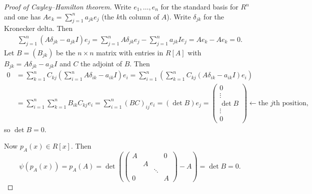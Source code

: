 \documentclass[a4paper]{article}
\theoremstyle{definition}
\begin{document}
\begin{proof}[Proof of Cayley–Hamilton theorem]
Write $e_1,\ldots,e_n$ for the standard basis for $R^n$ and one has $Ae_k=\sum_{j=1}^n a_{jk} e_j$ (the $k$th column of $A$). Write $\delta_{jk}$ for the Kronecker delta. Then
\[
\begin{aligned}
\sum_{j=1}^n \left(A\delta_{jk}-a_{jk}I\right) e_j=\sum_{j=1}^n A\delta_{jk}e_j - \sum_{j=1}^n a_{jk}Ie_j = Ae_k-Ae_k=0.
\end{aligned}
\]
Let $B=(B_{jk})$ be the $n\times n$ matrix with entries in $R[A]$ with $B_{jk}=A\delta_{jk}-a_{jk}I$ and $C$ the adjoint of $B$. Then
\[
\begin{aligned}
0&=\sum_{k=1}^n C_{kj} \left(\sum_{i=1}^n A\delta_{ik}-a_{ik} I\right)e_i = \sum_{i=1}^n \left( \sum_{k=1}^n C_{kj} (A\delta_{ik}-a_{ik}I)e_i \right) \\
&=\sum_{i=1}^n \sum_{k=1}^n B_{ik}C_{kj} e_i=\sum_{i=1}^n (BC)_{ij} e_i=(\det B )e_j=\begin{pmatrix}
0 \\ \vdots \\ \det B \\ \vdots \\ 0
\end{pmatrix} \leftarrow \text{the }j\text{th position} ,
\end{aligned}
\]
so $\det B=0$.

Now $p_A(x)\in R[x]$. Then
\[
\psi(p_A(x))=p_A(A)=\det \left( \begin{pmatrix}
  A & & & 0 \\ & A & & \\ & & \ddots & \\ 0 & & & A
\end{pmatrix}-A \right)=\det B=0.
\]
\end{proof}
\end{document}
